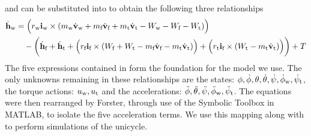 and can be substituted into  to obtain the following three relationships
\begin{align}
\dot{\mathbf{h}}_{\text{w}} &= \Big(r_{\text{w}}\mathbf{i}_{\text{w}} \times (m_{\text{w}}\dot{\mathbf{v}}_{\text{w}} + m_{\text{f}}\dot{\mathbf{v}}_{\text{f}} + m_{\text{t}}\dot{\mathbf{v}}_{\text{t}} -W_{\text{w}} - W_{\text{f}} - W_{\text{t}}) \Big) \label{eqn:uniE3} \\
\nonumber 
& \quad-\bigg(\dot{\mathbf{h}}_{\text{f}} +\dot{\mathbf{h}}_{\text{t}} + \Big( r_{\text{f}}\mathbf{i}_{\text{f}} \times (W_{\text{f}}+W_{\text{t}} - m_{\text{f}}\dot{\mathbf{v}}_{\text{f}} - m_{\text{t}}\dot{\mathbf{v}}_{\text{t}}) \Big) + \Big(r_{\text{t}}\mathbf{i}_{\text{f}} \times (W_{\text{t}}-m_{\text{t}}\dot{\mathbf{v}}_{\text{t}})\Big) \bigg) + T
\end{align}
The five expressions contained in  form the foundation for the model we use. The only unknowns remaining in these relationships are the states: $\phi, \dot\phi, \theta, \dot\theta, \dot\psi, \dot\phi_{\text{w}}, \dot\psi_{\text{t}}$, the torque actions: $u_{\text{w}}, u_{\text{t}}$ and the accelerations: $\ddot\phi,\ddot\theta,\ddot\psi,\ddot\phi_{\text{w}}, \ddot\psi_{\text{t}}$. The equations were then rearranged by Forster, through use of the Symbolic Toolbox in MATLAB, to isolate the five acceleration terms. We use this mapping along with  to perform simulations of the unicycle.



